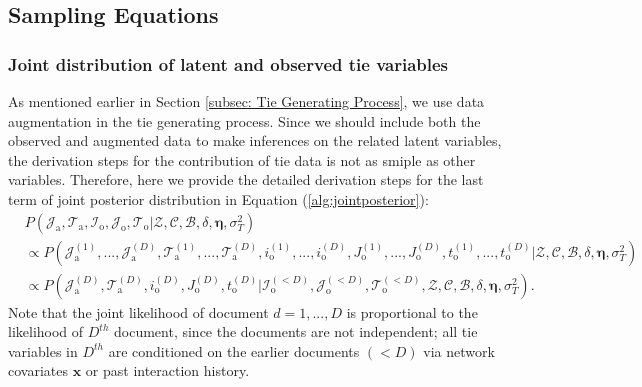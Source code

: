   	  \subsection{Sampling Equations}\label{subsec:Sampling Equations}
  	     \subsubsection{Joint distribution of latent and observed tie variables}\label{subsubsec:Joint distribution of Tie}
  	       As mentioned earlier in Section \ref{subsec: Tie Generating Process}, we use data augmentation in the tie generating process. Since we should include both the observed and augmented data to make inferences on the related latent variables, the derivation steps for the contribution of tie data is not as smiple as other variables. Therefore, here we provide the detailed derivation steps for the last term of joint posterior distribution in Equation (\ref{alg:jointposterior}): 
  	       \begin{equation}
  	       \begin{aligned}
  	       &P(\mathcal{J}_{\mbox{a}}, \mathcal{T}_{\mbox{a}},\mathcal{I}_{\mbox{o}}, \mathcal{J}_{\mbox{o}}, \mathcal{T}_{\mbox{o}} |\mathcal{Z}, \mathcal{C}, \mathcal{B}, \delta, \boldsymbol{\eta}, \sigma_T^2)
  	       \\& \propto P(\mathcal{J}^{(1)}_{\mbox{a}}, ...,\mathcal{J}^{(D)}_{\mbox{a}}, \mathcal{T}^{(1)}_{\mbox{a}},...,\mathcal{T}^{(D)}_{\mbox{a}}, i^{(1)}_{\mbox{o}},...,i^{(D)}_{\mbox{o}}, J^{(1)}_{\mbox{o}},...,J^{(D)}_{\mbox{o}}, t^{(1)}_{\mbox{o}},...,t^{(D)}_{\mbox{o}} |\mathcal{Z}, \mathcal{C}, \mathcal{B}, \delta, \boldsymbol{\eta}, \sigma_T^2)
  	       \\& \propto P(\mathcal{J}^{(D)}_{\mbox{a}}, \mathcal{T}^{(D)}_{\mbox{a}}, i^{(D)}_{\mbox{o}}, J^{(D)}_{\mbox{o}}, t^{(D)}_{\mbox{o}} |\mathcal{I}^{(<D)}_{\mbox{o}}, \mathcal{J}^{(<D)}_{\mbox{o}}, \mathcal{T}^{(<D)}_{\mbox{o}},\mathcal{Z}, \mathcal{C}, \mathcal{B}, \delta,\boldsymbol{\eta}, \sigma_T^2).
  	       \end{aligned}	  	\label{eqn:time}
  	       \end{equation}
  	       Note that the joint likelihood of document $d=1,...,D$ is proportional to the likelihood of $D^{th}$ document, since the documents are not independent; all tie variables in $D^{th}$ are conditioned on the earlier documents $(<D)$ via network covariates $\boldsymbol{x}$ or past interaction history. \\ \newline

